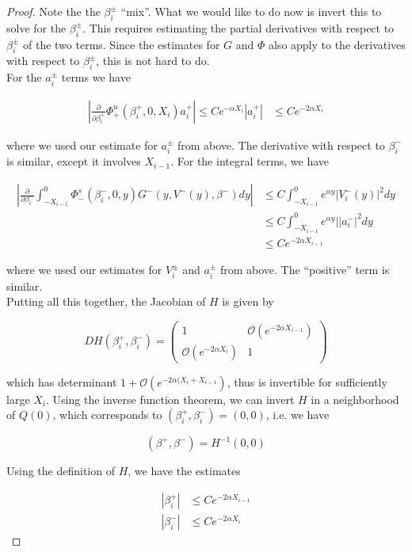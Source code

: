 \documentclass[thesis.tex]{subfiles}
\begin{document}
\begin{lemma}
\begin{proof}
Note the the $\beta_i^\pm$ ``mix''. What we would like to do now is invert this to solve for the $\beta_i^\pm$. This requires estimating the partial derivatives with respect to $\beta_i^\pm$ of the two terms. Since the estimates for $G$ and $\Phi$ also apply to the derivatives with respect to $\beta_i^\pm$, this is not hard to do.\\

For the $a_i^\pm$ terms we have

\begin{align*}
\left| \frac{\partial}{\partial \beta_i^+} \Phi^u_+(\beta_i^+, 0, X_i) a_i^+ \right| \leq C e^{-\alpha X_i}|a_i^+|
& \leq C e^{-2 \alpha X_i}
\end{align*}

where we used our estimate for $a_i^\pm$ from above. The derivative with respect to $\beta_i^-$ is similar, except it involves $X_{i-1}$. For the integral terms, we have

\begin{align*}
\left| \frac{\partial}{\partial \beta_i^-} \int_{-X_{i-1}}^0 \Phi_-^s(\beta_i^-, 0, y) G^-(y, V^-(y),\beta^-)dy \right| 
&\leq C \int_{-X_{i-1}}^0 e^{\alpha y} | V_i^-(y) |^2 dy \\
&\leq C \int_{-X_{i-1}}^0 e^{\alpha y} | |a_i^-|^2 dy \\
&\leq C e^{-2 \alpha X_{i-1}}
\end{align*}

where we used our estimates for $V_i^\pm$ and $a_i^\pm$ from above. The ``positive'' term is similar. \\

Putting all this together, the Jacobian of $H$ is given by

\begin{equation}
D H(\beta_i^+, \beta_i^-) = 
\begin{pmatrix}
1 & \mathcal{O}(e^{-2 \alpha X_{i-1}} ) \\
\mathcal{O}(e^{-2 \alpha X_i}) &  1 
\end{pmatrix}
\end{equation}

which has determinant $1 + \mathcal{O}(e^{-2\alpha (X_i+X_{i-1}})$, thus is invertible for sufficiently large $X_i$. Using the inverse function theorem, we can invert $H$ in a neighborhood of $Q(0)$, which corresponds to $(\beta_i^+, \beta_i^-) = (0, 0)$, i.e. we have 

\[
(\beta^+, \beta^-) = H^{-1}(0, 0)
\]

Using the definition of $H$, we have the estimates

\begin{align*}
| \beta_i^+ | &\leq C e^{-2 \alpha X_{i-1}} \\
| \beta_i^- | &\leq C e^{-2 \alpha X_i}
\end{align*}

\end{proof}
\end{lemma}
\end{document}
